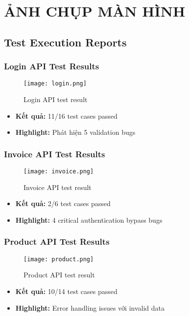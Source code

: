 \documentclass[12pt,a4paper]{article}
\begin{document}
  \section{ẢNH CHỤP MÀN HÌNH}

  \subsection{Test Execution Reports}

  \subsubsection{Login API Test Results}
  \begin{figure}[H]
      \centering
      \texttt{[image: login.png]}
      \caption{Login API test result}
      \label{fig:placeholder}
  \end{figure}
  \begin{itemize}
  \item \textbf{Kết quả:} 11/16 test cases passed
  \item \textbf{Highlight:} Phát hiện 5 validation bugs
  \end{itemize}

  \subsubsection{Invoice API Test Results}
  \begin{figure}[H]
      \centering
      \texttt{[image: invoice.png]}
      \caption{Invoice API test result}
  \end{figure}
  \begin{itemize}
  \item \textbf{Kết quả:} 2/6 test cases passed
  \item \textbf{Highlight:} 4 critical authentication bypass bugs
  \end{itemize}

  \subsubsection{Product API Test Results}
  \begin{figure}[H]
      \centering
      \texttt{[image: product.png]}
      \caption{Product API test result}
  \end{figure}
  \begin{itemize}
  \item \textbf{Kết quả:} 10/14 test cases passed
  \item \textbf{Highlight:} Error handling issues với invalid data
  \end{itemize}
\end{document}

